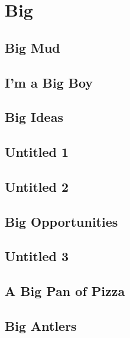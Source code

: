 \documentclass[oneside,14pt]{memoir} %
\newcommand{\chapterIvar}{poem/big_mud.tex}
\newcommand{\chapterIIvar}{poem/im_a_big_boy.tex}
\newcommand{\chapterIIIvar}{poem/big_ideas.tex}
\newcommand{\chapterIVvar}{poem/untitled_1.tex}
\newcommand{\chapterVvar}{poem/untitled_2.tex}
\newcommand{\chapterVIvar}{poem/big_opportunities.tex}
\newcommand{\chapterIXvar}{poem/untitled_3.tex}
\newcommand{\chapterXvar}{poem/a_big_pan_of_pizza.tex}
\newcommand{\chapterXIvar}{poem/big_antlers.tex}
\begin{document}
\part{Big}


\chapter{Big Mud}


\chapter{I'm a Big Boy}


\chapter{Big Ideas}


\chapter{Untitled 1}


\chapter{Untitled 2}


\chapter{Big Opportunities}


\chapter{Untitled 3}


\chapter{A Big Pan of Pizza}


\chapter{Big Antlers}

\end{document}
